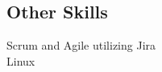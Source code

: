 \documentclass[letterpaper]{deedy-resume} %
\begin{document}
\begin{minipage}[t]{0.33\textwidth}
\vspace{5pt}
\subsection{Other Skills}

\textbullet{} Scrum and Agile utilizing Jira\\
\textbullet{} Linux\\

\sectionspace %


\end{minipage} %
\hfill
%
%
\end{document}
